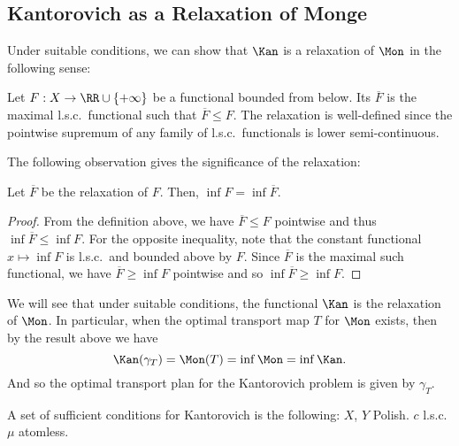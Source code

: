 \documentclass[oneside,reqno,letterpaper]{amsart}
\begin{document}
\subsection{Kantorovich as a Relaxation of Monge}
Under suitable conditions, we can show that \(\Kan\) is a relaxation of \(\Mon\) in the following sense:
\begin{definition}[Relaxation]
  Let \(F: X \to \RR \cup \left\{+\infty\right\}\) be a functional bounded from below.
  Its  \(\overline{F}\) is the maximal l.s.c.\ functional such that \(\overline{F} \leq F\).
  The relaxation is well-defined since the pointwise supremum of any family of l.s.c.\ functionals is lower semi-continuous.
\end{definition}

The following observation gives the significance of the relaxation:
\begin{proposition}
  Let \(\overline{F}\) be the relaxation of \(F\).
  Then, \(\inf F = \inf \overline{F}\).
\end{proposition}
\begin{proof}
  From the definition above, we have \(\overline{F} \leq F\) pointwise and thus \(\inf \overline{F} \leq \inf F\).
  For the opposite inequality, note that the constant functional \(x \mapsto \inf F\) is l.s.c.\ and bounded above by \(F\).
  Since \(\overline{F}\) is the maximal such functional, we have \(\overline{F} \geq \inf F\) pointwise and so \(\inf \overline{F} \geq \inf F\).
\end{proof}


We will see that under suitable conditions, the functional \(\Kan\) is the relaxation of \(\Mon\).
In particular, when the optimal transport map \(T\) for \(\Mon\) exists, then by the result above we have
\[
  \Kan(\gamma_T)
  = \Mon(T)
  = \inf \Mon
  = \inf \Kan.
\]
And so the optimal transport plan for the Kantorovich problem is given by \(\gamma_T\).



\begin{itodo}
A set of sufficient conditions for Kantorovich is the following:
\(X\), \(Y\) Polish.
\(c\) l.s.c.
\(\mu\) atomless.
\end{itodo}
\end{document}
